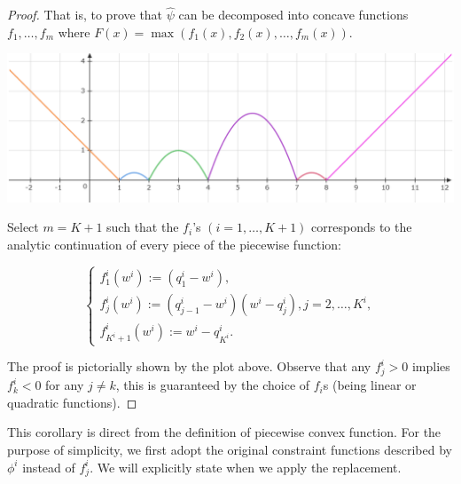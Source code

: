 \documentclass[10pt,a4paper]{article}
\begin{document}
\begin{proof}
    That is, to prove that $\hat{\psi}$ can be decomposed into concave functions $f_1, \ldots, f_m$ where $F(x)=\max(f_1(x), f_2(x), \ldots, f_m(x))$.

    \begin{center}
        \includegraphics[width=0.5\linewidth]{psi.png}
    \end{center}

    Select $m=K+1$ such that the $f_i$'s $(i=1, \ldots, K+1)$ corresponds to the analytic continuation of every piece of the piecewise function:

    $$\begin{cases}f^i_1(w^i):=(q^i_{1}-w^i),\\f^i_j(w^i):=(q^i_{j-1}-w^i)(w^i-q^i_{j}), j=2,\ldots, K^i,\\f^i_{K^i+1}(w^i):=w^i-q^i_{K^i}.\end{cases}$$

    The proof is pictorially shown by the plot above. Observe that any $f^i_j>0$ implies $f^i_k<0$ for any $j\neq k$, this is guaranteed by the choice of $f_i$s (being linear or quadratic functions).
\end{proof}


This corollary is direct from the definition of piecewise convex function. For the purpose of simplicity, we first adopt the original constraint functions described by $\phi^i$ instead of $f^i_j$. We will explicitly state when we apply the replacement.

\end{document}
